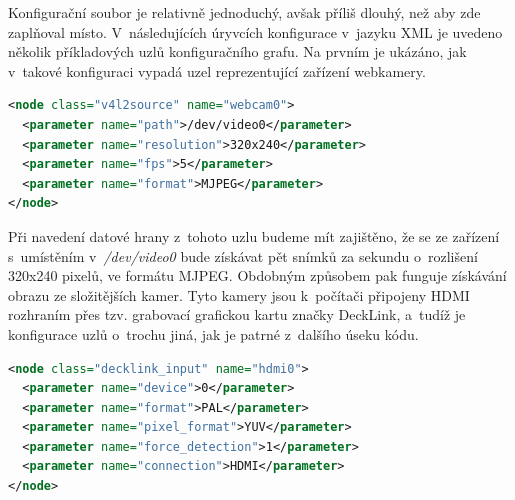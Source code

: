 \documentclass[thesis=M,czech]{FITthesis}[2012/06/26]
\begin{document}
Konfigurační soubor je relativně jednoduchý, avšak příliš dlouhý, než aby zde zaplňoval místo. V~následujících úryvcích konfigurace v~jazyku XML je uvedeno několik příkladových uzlů konfiguračního grafu. Na prvním je ukázáno, jak v~takové konfiguraci vypadá uzel reprezentující zařízení webkamery.\\

\begin{lstlisting}[language=XML]
<node class="v4l2source" name="webcam0">
  <parameter name="path">/dev/video0</parameter>
  <parameter name="resolution">320x240</parameter>
  <parameter name="fps">5</parameter>
  <parameter name="format">MJPEG</parameter>
</node>
\end{lstlisting}

Při navedení datové hrany z~tohoto uzlu budeme mít zajištěno, že se ze zařízení s~umístěním v~\textit{/dev/video0} bude získávat pět snímků za sekundu o~rozlišení 320x240 pixelů, ve formátu MJPEG. Obdobným způsobem pak funguje získávání obrazu ze složitějších kamer. Tyto kamery jsou k~počítači připojeny HDMI rozhraním přes tzv. grabovací grafickou kartu značky DeckLink, a~tudíž je konfigurace uzlů o~trochu jiná, jak je patrné z~dalšího úseku kódu.\\

\begin{lstlisting}[language=XML]
<node class="decklink_input" name="hdmi0">
  <parameter name="device">0</parameter>
  <parameter name="format">PAL</parameter>
  <parameter name="pixel_format">YUV</parameter>
  <parameter name="force_detection">1</parameter>
  <parameter name="connection">HDMI</parameter>
</node>
\end{lstlisting}
\end{document}
